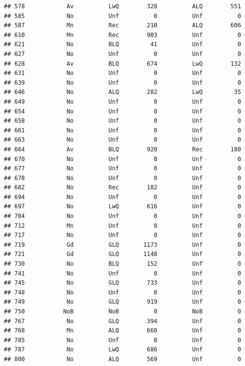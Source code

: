 \documentclass[]{article}
\begin{document}
\begin{verbatim}
## 578            Av          LwQ        328          ALQ        551
## 585            No          Unf          0          Unf          0
## 587            Mn          Rec        210          ALQ        606
## 610            Mn          Rec        903          Unf          0
## 621            No          BLQ         41          Unf          0
## 627            No          Unf          0          Unf          0
## 628            Av          BLQ        674          LwQ        132
## 631            No          Unf          0          Unf          0
## 639            No          Unf          0          Unf          0
## 646            No          ALQ        282          LwQ         35
## 649            No          Unf          0          Unf          0
## 654            No          Unf          0          Unf          0
## 658            No          Unf          0          Unf          0
## 661            No          Unf          0          Unf          0
## 663            No          Unf          0          Unf          0
## 664            Av          BLQ        920          Rec        180
## 670            No          Unf          0          Unf          0
## 677            No          Unf          0          Unf          0
## 678            No          Unf          0          Unf          0
## 682            No          Rec        182          Unf          0
## 694            No          Unf          0          Unf          0
## 697            No          LwQ        616          Unf          0
## 704            No          Unf          0          Unf          0
## 712            Mn          Unf          0          Unf          0
## 717            No          Unf          0          Unf          0
## 719            Gd          GLQ       1173          Unf          0
## 721            Gd          GLQ       1148          Unf          0
## 730            No          BLQ        152          Unf          0
## 741            No          Unf          0          Unf          0
## 745            No          GLQ        733          Unf          0
## 748            No          Unf          0          Unf          0
## 749            No          GLQ        919          Unf          0
## 750           NoB          NoB          0          NoB          0
## 767            No          GLQ        394          Unf          0
## 768            Mn          ALQ        660          Unf          0
## 785            No          Unf          0          Unf          0
## 787            No          LwQ        686          Unf          0
## 800            No          ALQ        569          Unf          0

\end{verbatim}
\end{document}
